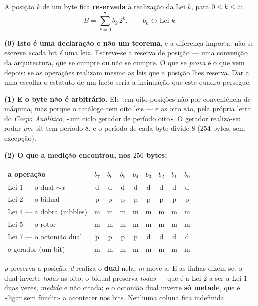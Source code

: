 \documentclass[livro.tex]{subfiles}
\begin{document}
\begin{definicao}\label{def:byte-oito}
A posição $k$ de um byte fica \textbf{reservada} à realização da Lei $k$,
para $0\le k\le 7$:
\[
B=\sum_{k=0}^{7}b_k\,2^{k},
\qquad
b_k \longleftrightarrow \text{Lei }k .
\]

\textbf{(0) Isto é uma declaração e não um teorema}, e a diferença
importa: não se escreve «cada bit \emph{é} uma lei». Escreve-se a
reserva de posição --- uma convenção da arquitectura, que se cumpre ou
não se cumpre. O que se \emph{prova} é o que vem depois: se as operações
realizam mesmo as leis que a posição lhes reserva. Dar a uma escolha o
estatuto de um facto seria a insinuação que este quadro persegue.

\textbf{(1) E o byte não é arbitrário.} Ele tem oito posições não por
conveniência de máquina, mas porque o catálogo tem oito leis --- e as
oito são, pela própria letra do \emph{Corpo Analítico}, «um ciclo gerador
de período oito». O gerador realiza-se: rodar \emph{um} bit tem período
$8$, e o período de cada byte divide $8$ ($254$ bytes, sem excepção).

\textbf{(2) O que a medição encontrou, nos $256$ bytes:}
\begin{center}\small
\begin{tabular}{@{}lcccccccc@{}}
\toprule
a operação & $b_7$ & $b_6$ & $b_5$ & $b_4$ & $b_3$ & $b_2$ & $b_1$ & $b_0$\\
\midrule
Lei 1 --- o dual $\sim\!x$ & d & d & d & d & d & d & d & d\\
Lei 2 --- o bidual & p & p & p & p & p & p & p & p\\
Lei 4 --- a dobra (nibbles) & m & m & m & m & m & m & m & m\\
Lei 5 --- o rotor & m & m & m & m & m & m & m & m\\
Lei 7 --- o octonião dual & p & p & p & p & d & d & d & d\\
o gerador (um bit) & m & m & m & m & m & m & m & m\\
\bottomrule
\end{tabular}
\end{center}
\noindent\emph{p} preserva a posição, \emph{d} realiza o \textbf{dual}
nela, \emph{m} move-a. E as linhas dizem-se: o dual inverte
\emph{todas} as oito; o bidual preserva \emph{todas} --- que é a Lei 2 a
ser a Lei 1 duas vezes, \emph{medida} e não citada; e o octonião dual
inverte \textbf{só metade}, que é «ligar sem fundir» a acontecer nos
bits. Nenhuma coluna fica indefinida.


\end{definicao}
\end{document}
